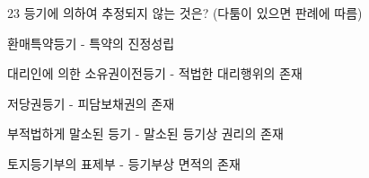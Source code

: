 \begin{question}{23}
등기에 의하여 추정되지 않는 것은? (다툼이 있으면 판례에 따름)
\begin{choices}
  \item 환매특약등기 - 특약의 진정성립
  \item 대리인에 의한 소유권이전등기 - 적법한 대리행위의 존재
  \item 저당권등기 - 피담보채권의 존재
  \item 부적법하게 말소된 등기 - 말소된 등기상 권리의 존재
  \item 토지등기부의 표제부 - 등기부상 면적의 존재
\end{choices}
\end{question}
